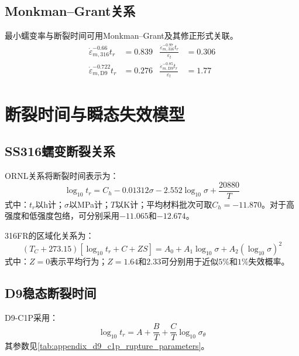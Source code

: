 \subsection{Monkman--Grant关系}

最小蠕变率与断裂时间可用Monkman--Grant及其修正形式关联。
\begin{equation}
	\label{eq:appendix_cladding_monkman_grant}
	\begin{aligned}
		\dot\varepsilon_{m,316}^{-0.66}t_r&=0.839
		&
		\frac{\dot\varepsilon_{m,316}^{-0.97}t_r}{\varepsilon_t}&=0.306\\
		\dot\varepsilon_{m,\mathrm{D9}}^{-0.722}t_r&=0.276
		&
		\frac{\dot\varepsilon_{m,\mathrm{D9}}^{-0.85}t_r}{\varepsilon_t}&=1.77
	\end{aligned}
\end{equation}


\section{断裂时间与瞬态失效模型}
\label{app:cladding_rupture_models}

\subsection{SS316蠕变断裂关系}

ORNL关系将断裂时间表示为\cite{brinkmanElevatedTemperatureMechanicalProperties2001}：
\begin{equation}
	\log_{10}t_r
	=C_h-0.01312\sigma
	-2.552\log_{10}\sigma
	+\frac{20880}{T}
	\label{eq:appendix_ss316_ornl_rupture_time}
\end{equation}
\noindent 式中：$t_r$以h计；$\sigma$以MPa计；$T$以K计；平均材料批次可取$C_h=-11.870$。对于高强度和低强度包络，可分别采用$-11.065$和$-12.674$。

316FR的区域化关系为\cite{OnizawaDevelopmentCreepProperty2019}：
\begin{equation}
	(T_C+273.15)
	[\log_{10}t_r+C+ZS]
	=A_0+A_1\log_{10}\sigma
	+A_2(\log_{10}\sigma)^2
	\label{eq:appendix_316fr_rupture_time}
\end{equation}
\noindent 式中：$Z=0$表示平均行为；$Z=1.64$和$2.33$可分别用于近似$5\%$和$1\%$失效概率。

\subsection{D9稳态断裂时间}

D9-C1P采用：
\begin{equation}
	\log_{10}t_r
	=A+\frac{B}{T}
	+\frac{C}{T}\log_{10}\sigma_\theta
	\label{eq:appendix_d9_c1p_rupture_time}
\end{equation}
其参数见\tablename\ref{tab:appendix_d9_c1p_rupture_parameters}。


